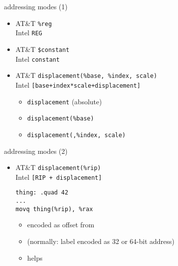 
\begin{frame}[fragile,label=addressing1]{addressing modes (1)}
    \begin{itemize}
        \item {\small AT\&T} {\tt \%reg}\\ {\small Intel} {\tt REG}
        \item {\small AT\&T} {\tt \$constant} \\{\small Intel} {\tt constant}
        \item {\small AT\&T} {\tt displacement(\%base, \%index, scale)} \\
        {\small Intel} {\tt [base+index*scale+displacement]}
            \begin{itemize}
            \item {\tt displacement} (absolute)
            \item {\tt displacement(\%base)}
            \item {\tt displacement(,\%index, scale)}
            \end{itemize}
    \end{itemize}
\end{frame}

\begin{frame}[fragile,label=addressing2]{addressing modes (2)}
    \begin{itemize}
        \item {\small AT\&T} {\tt displacement(\%rip)} \\
              {\small Intel} {\tt [RIP + displacement]}

\begin{lstlisting}
thing: .quad 42
...
movq thing(%rip), %rax
\end{lstlisting}
        \begin{itemize}
        \item encoded as offset from 
        \item (normally: label encoded as 32 or 64-bit address)
        \item helps 
        \end{itemize}
    \end{itemize}
\end{frame}


